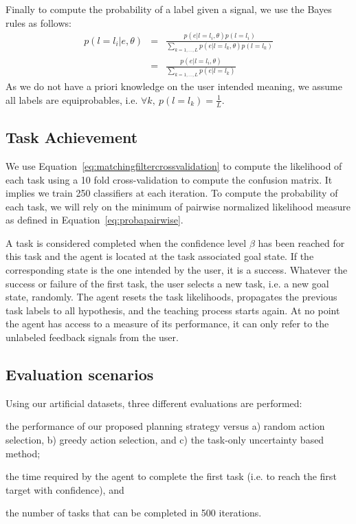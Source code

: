 Finally to compute the probability of a label given a signal, we use the Bayes rules as follows: 
%
\begin{eqnarray}
    p(l = l_i|e,\theta) &=& \frac{p(e|l = l_i, \theta)p(l = l_i)}{\sum_{k = 1,\ldots, L}{p(e|l = l_k,\theta)p(l = l_k)}}\nonumber \\
    &=& \frac{p(e|l=l_i, \theta)}{\sum_{k = 1,\ldots, L} p(e|l=l_k)} \nonumber
\end{eqnarray}
%
As we do not have a priori knowledge on the user intended meaning, we assume all labels are equiprobables, i.e. $\forall k,~p(l = l_k) = \frac{1}{L}$.

\subsection{Task Achievement}

We use Equation~\ref{eq:matchingfiltercrossvalidation} to compute the likelihood of each task using a 10 fold cross-validation to compute the confusion matrix. It implies we train 250 classifiers at each iteration. To compute the probability of each task, we will rely on the minimum of pairwise normalized likelihood measure as defined in Equation~\ref{eq:probapairwise}.

A task is considered completed when the confidence level $\beta$ has been reached for this task and the agent is located at the task associated goal state. If the corresponding state is the one intended by the user, it is a success. Whatever the success or failure of the first task, the user selects a new task, i.e. a new goal state, randomly. The agent resets the task likelihoods, propagates the previous task labels to all hypothesis, and the teaching process starts again. At no point the agent has access to a measure of its performance, it can only refer to the unlabeled feedback signals from the user.

\subsection{Evaluation scenarios}

Using our artificial datasets, three different evaluations are performed: \begin{inparaenum}[(i)] \item the performance of our proposed planning strategy versus a) random action selection, b) greedy action selection, and c) the task-only uncertainty based method; \item the time required by the agent to complete the first task (i.e. to reach the first target with confidence), and \item the number of tasks that can be completed in 500 iterations. \end{inparaenum}

